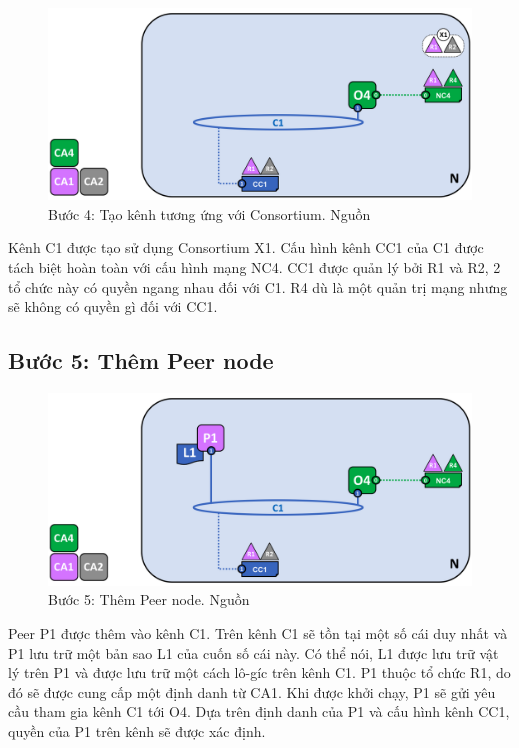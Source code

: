 \documentclass[../DoAn.tex]{subfiles}
\begin{document}
\begin{figure}[h]
  \centering
  \includegraphics[width=0.75\linewidth]{Hinhve/network.diagram.4.png}
  \caption[Bước 4: Tạo kênh tương ứng với Consortium]{Bước 4: Tạo kênh tương ứng với Consortium. Nguồn \cite{fabric_architecture}}
  \label{fig:fabric_step_4}
\end{figure}

Kênh C1 được tạo sử dụng Consortium X1. Cấu hình kênh CC1 của C1 được tách biệt
hoàn toàn với cấu hình mạng NC4. CC1 được quản lý bởi R1 và R2, 2 tổ chức này
có quyền ngang nhau đối với C1. R4 dù là một quản trị mạng nhưng sẽ không có
quyền gì đối với CC1.

\subsection{Bước 5: Thêm Peer node}

\begin{figure}[h]
  \centering
  \includegraphics[width=0.75\linewidth]{Hinhve/network.diagram.5.png}
  \caption[Bước 5: Thêm Peer node]{Bước 5: Thêm Peer node. Nguồn \cite{fabric_architecture}}
  \label{fig:fabric_step_5}
\end{figure}

Peer P1 được thêm vào kênh C1. Trên kênh C1 sẽ tồn tại một số cái duy nhất và
P1 lưu trữ một bản sao L1 của cuốn số cái này. Có thể nói, L1 được lưu trữ vật
lý trên P1 và được lưu trữ một cách lô-gíc trên kênh C1. P1 thuộc tổ chức R1,
do đó sẽ được cung cấp một định danh từ CA1. Khi được khởi chạy, P1 sẽ gửi yêu
cầu tham gia kênh C1 tới O4. Dựa trên định danh của P1 và cấu hình kênh CC1,
quyền của P1 trên kênh sẽ được xác định.
\end{document}
